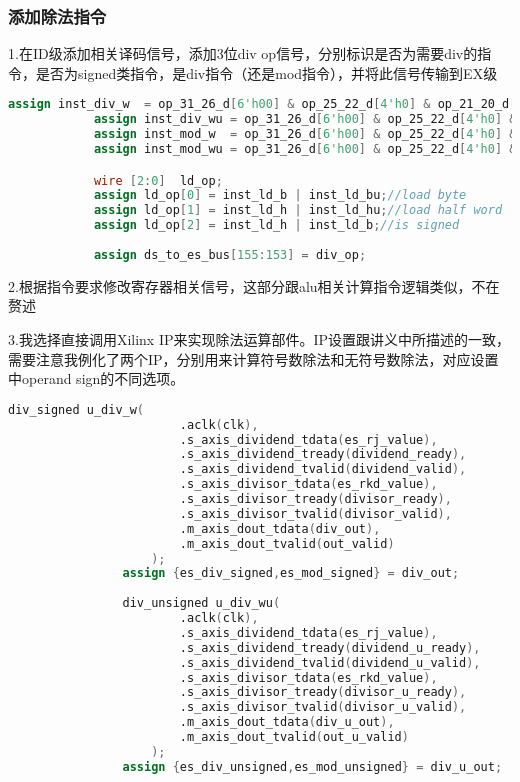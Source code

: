 \documentclass[12pt,a4paper]{article}
\begin{document}
        \subsubsection{添加除法指令}
            1.在ID级添加相关译码信号，添加3位div op信号，分别标识是否为需要div的指令，是否为signed类指令，是div指令（还是mod指令），并将此信号传输到EX级
            \begin{lstlisting}[language=Verilog]
            assign inst_div_w  = op_31_26_d[6'h00] & op_25_22_d[4'h0] & op_21_20_d[2'h2] & op_19_15_d[5'h00];
            assign inst_div_wu = op_31_26_d[6'h00] & op_25_22_d[4'h0] & op_21_20_d[2'h2] & op_19_15_d[5'h02];
            assign inst_mod_w  = op_31_26_d[6'h00] & op_25_22_d[4'h0] & op_21_20_d[2'h2] & op_19_15_d[5'h01];
            assign inst_mod_wu = op_31_26_d[6'h00] & op_25_22_d[4'h0] & op_21_20_d[2'h2] & op_19_15_d[5'h03];

            wire [2:0]  ld_op;
            assign ld_op[0] = inst_ld_b | inst_ld_bu;//load byte
            assign ld_op[1] = inst_ld_h | inst_ld_hu;//load half word
            assign ld_op[2] = inst_ld_h | inst_ld_b;//is signed
            
            assign ds_to_es_bus[155:153] = div_op;
            \end{lstlisting}
            \par
            2.根据指令要求修改寄存器相关信号，这部分跟alu相关计算指令逻辑类似，不在赘述
            \par
            3.我选择直接调用Xilinx IP来实现除法运算部件。IP设置跟讲义中所描述的一致，需要注意我例化了两个IP，分别用来计算符号数除法和无符号数除法，对应设置中operand sign的不同选项。
            \begin{lstlisting}[language=Verilog]
                div_signed u_div_w(
                        .aclk(clk),
                        .s_axis_dividend_tdata(es_rj_value),
                        .s_axis_dividend_tready(dividend_ready),
                        .s_axis_dividend_tvalid(dividend_valid),
                        .s_axis_divisor_tdata(es_rkd_value),
                        .s_axis_divisor_tready(divisor_ready),
                        .s_axis_divisor_tvalid(divisor_valid),
                        .m_axis_dout_tdata(div_out),
                        .m_axis_dout_tvalid(out_valid)
                    );
                assign {es_div_signed,es_mod_signed} = div_out;
                
                div_unsigned u_div_wu(
                        .aclk(clk),
                        .s_axis_dividend_tdata(es_rj_value),
                        .s_axis_dividend_tready(dividend_u_ready),
                        .s_axis_dividend_tvalid(dividend_u_valid),
                        .s_axis_divisor_tdata(es_rkd_value),
                        .s_axis_divisor_tready(divisor_u_ready),
                        .s_axis_divisor_tvalid(divisor_u_valid),
                        .m_axis_dout_tdata(div_u_out),
                        .m_axis_dout_tvalid(out_u_valid)
                    );
                assign {es_div_unsigned,es_mod_unsigned} = div_u_out;
            \end{lstlisting}
\end{document}
